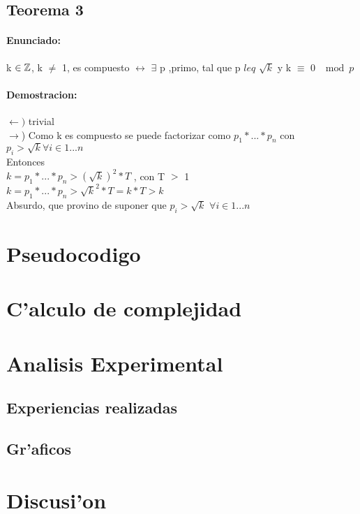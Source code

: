 \subsection{Teorema 3}
\paragraph{Enunciado:}
k ${\in {\mathbb Z}}$, k $\neq$ 1, es compuesto $\longleftrightarrow$ $\exists$ p ,primo, tal que p $leq$ $\sqrt{k}$ y k $\equiv$ 0 $\mod{p}$ \\
\paragraph{Demostracion:}
$\leftarrow)$ trivial \\
$\rightarrow$) Como k es compuesto se puede factorizar como $p_1*...*p_n$ con $p_i > \sqrt{k} \forall i \in {1...n}$\\
Entonces \\
$k = p_1*...*p_n > (\sqrt{k})^2* T $ , con T $>$ 1\\  
$k = p_1*...*p_n > \sqrt{k}^2* T = k*T > k$ \\
Absurdo, que provino de suponer que $p_i > \sqrt{k}$ $\forall i \in {1...n}$\\

\section{Pseudocodigo}


\section{C'alculo de complejidad}

\section{Analisis Experimental}
\subsection{Experiencias realizadas}

\subsection{Gr'aficos}

\section{Discusi'on}


